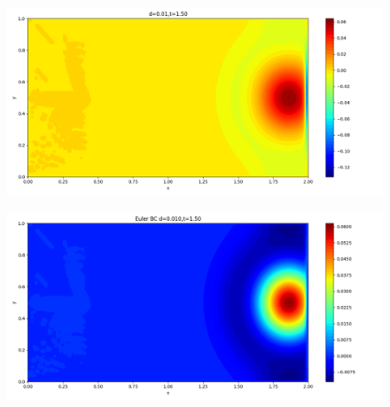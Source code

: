 \documentclass[12pt]{article}
\begin{document}
\begin{figure}[H]
\begin{minipage}{\linewidth}
\begin{minipage}{0.5\textwidth}
\includegraphics[width=\linewidth]{figures/3d0.01t1.50.png}
\label{fig7}
\end{minipage}\hfill
\begin{minipage}{0.5\textwidth}
\includegraphics[width=\linewidth]{figures/3Ed0.010t1.50.png}
\label{fig8}
\end{minipage}
\vspace{-1.5em}


\end{minipage}
\end{figure}
\end{document}
